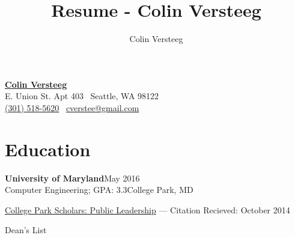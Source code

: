 \documentclass[letterpaper,12pt]{article}
\title{Resume - Colin Versteeg}
\author{Colin Versteeg}
\makeatletter
\def \myrespresectionskip {-.25in}
\newcommand{\myheader}{
\begin{center}
    \href{http://www.linkedin.com/pub/colin-versteeg/5b/26b/1b8}{{\huge\bf\sffamily Colin Versteeg}} \\
   \sffamily 1408 E. Union St. Apt 403 \textbullet \, Seattle, WA 98122 \\ 
\href{callto:3015185620}{\sffamily(301) 518-5620} \textbullet \, \href{mailto:cverstee@gmail.com}{\sffamily cverstee@gmail.com} 
\end{center}
}
\newcommand{\resheading}[5]{
\normalsize{\textbf{#1}}\hfill{\rmfamily\normalsize\textcolor{faded}{#2}} \\
\normalsize{#3}\hfill{\textcolor{faded}{\normalsize#4}}\\
\normalsize{#5}
\normalsize
}
\makeatother
\begin{document}
\myheader
\vspace{-.3in}
\section*{Education}
\resheading{{University of Maryland}}{May 2016}{Computer Engineering; GPA: 3.3}{College Park, MD}{}\footnotesize
 \begin{resumeitemize}
	\vspace{-.2in}
            \item{\href{http://www.scholars.umd.edu/programs/pl}{College Park Scholars: Public Leadership} --- Citation Recieved: October 2014}
\item{Dean's List}
          \end{resumeitemize}

\vspace{\myrespresectionskip}
\end{document}
